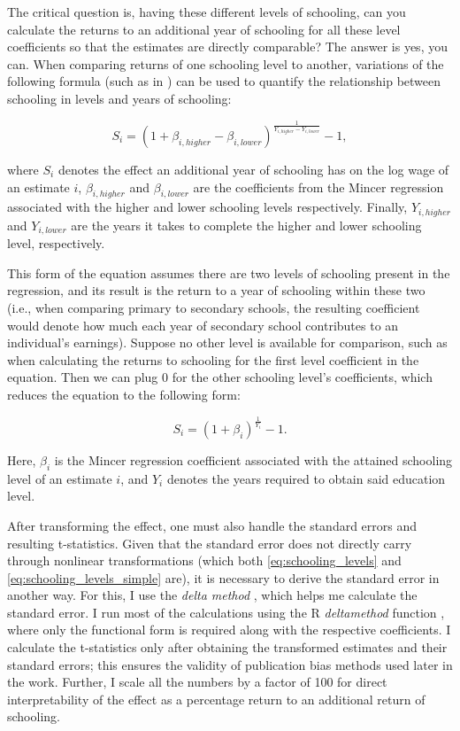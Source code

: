 The critical question is, having these different levels of schooling, can you calculate the returns to an additional year of schooling for all these level coefficients so that the estimates are directly comparable? The answer is yes, you can. When comparing returns of one schooling level to another, variations of the following formula (such as in \cite{agrawal2012returns}) can be used to quantify the relationship between schooling in levels and years of schooling:

\begin{equation}
   \label{eq:schooling_levels}
   S_i = \left(1 + \beta_{i, higher} - \beta_{i, lower}\right)^{\frac{1}{Y_{i, higher} - Y_{i, lower}}} - 1,
\end{equation}

where $S_i$ denotes the effect an additional year of schooling has on the log wage of an estimate $i$, $\beta_{i, higher}$ and $\beta_{i, lower}$ are the coefficients from the Mincer regression associated with the higher and lower schooling levels respectively. Finally, $Y_{i,higher}$ and $Y_{i,lower}$ are the years it takes to complete the higher and lower schooling level, respectively.

This form of the equation assumes there are two levels of schooling present in the regression, and its result is the return to a year of schooling within these two (i.e., when comparing primary to secondary schools, the resulting coefficient would denote how much each year of secondary school contributes to an individual's earnings). Suppose no other level is available for comparison, such as when calculating the returns to schooling for the first level coefficient in the equation. Then we can plug 0 for the other schooling level's coefficients, which reduces the equation to the following form:

\begin{equation}
   \label{eq:schooling_levels_simple}
   S_i = \left(1 + \beta_i\right)^{\frac{1}{Y_i}} - 1.
\end{equation}

Here, $\beta_i$ is the Mincer regression coefficient associated with the attained schooling level of an estimate $i$, and $Y_i$ denotes the years required to obtain said education level.

After transforming the effect, one must also handle the standard errors and resulting t-statistics. Given that the standard error does not directly carry through nonlinear transformations (which both \autoref{eq:schooling_levels} and \autoref{eq:schooling_levels_simple} are), it is necessary to derive the standard error in another way. For this, I use the \textit{delta method} \citep{ziegel2002statistical}, which helps me calculate the standard error. I run most of the calculations using the R \textit{deltamethod} function \citep{fox2018r}, where only the functional form is required along with the respective coefficients. I calculate the t-statistics only after obtaining the transformed estimates and their standard errors; this ensures the validity of publication bias methods used later in the work. Further, I scale all the numbers by a factor of 100 for direct interpretability of the effect as a percentage return to an additional return of schooling.

